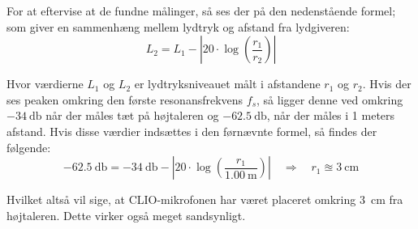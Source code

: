 For at eftervise at de fundne målinger, så ses der på den nedenstående formel; som giver en sammenhæng mellem lydtryk og afstand fra lydgiveren:
\begin{equation}
L_2 = L_1 - \left| 20 \cdot \log \left( \frac{r_1}{r_2} \right) \right|
\end{equation}

Hvor værdierne $L_1$ og $L_2$ er lydtryksniveauet målt i afstandene $r_1$ og $r_2$. Hvis der ses peaken omkring den første resonansfrekvens $f_s$, så ligger denne ved omkring $-\SI{34}{\decibel}$ når der måles tæt på højtaleren og $-\SI{62.5}{\decibel}$, når der måles i 1 meters afstand. Hvis disse værdier indsættes i den førnævnte formel, så findes der følgende:
\begin{equation}
\SI{-62.5}{\decibel} = \SI{-34}{\decibel} - \left| 20 \cdot \log \left( \frac{r_1}{\SI{1.00}{\meter}} \right)\right| \quad \Rightarrow \quad r_1 \approxeq \SI{3}{\centi\meter}
\end{equation}

Hvilket altså vil sige, at CLIO-mikrofonen har været placeret omkring \SI{3}{\centi\meter} fra højtaleren. Dette virker også meget sandsynligt.